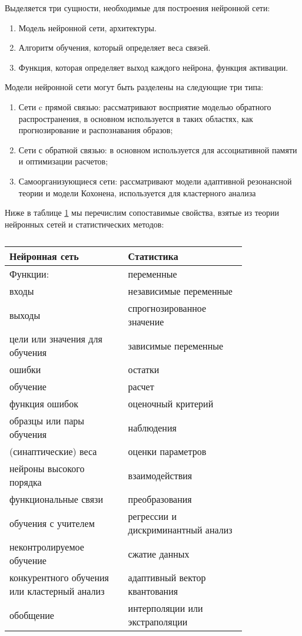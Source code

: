 Выделяется три сущности, необходимые для построения нейронной сети:
\begin{enumerate}
\item Модель нейронной сети, архитектуры.
\item Алгоритм обучения, который определяет веса связей.
\item Функция, которая определяет выход каждого нейрона, функция активации.
\end{enumerate}
Модели нейронной сети могут быть разделены
на следующие три типа:
\begin{enumerate}
	\item Сети c прямой связью: рассматривают восприятие
моделью обратного распространения, в основном используется в таких областях, как прогнозирование
и распознавания образов;
	\item Сети с обратной связью: в основном используется для
ассоциативной памяти и оптимизации расчетов;
	\item Самоорганизующиеся сети: рассматривают модели адаптивной
резонансной теории и модели Кохонена, используется для кластерного анализа
\end{enumerate}

Ниже в таблице \ref{table:neuro_stat_compare} мы перечислим сопоставимые свойства, взятые из теории 
нейронных сетей и статистических методов:

\begin{table}[!h]
\caption{}
\label{table:neuro_stat_compare}
\begin{center}
\begin{tabular}{|p{0.4\linewidth}|p{0.4\linewidth}|}
\hline \textbf{Нейронная сеть} & \textbf{Статистика} \\
\hline Функции: & переменные \\
\hline входы & независимые переменные \\
\hline выходы & спрогнозированное значение \\
\hline цели или значения для обучения & зависимые переменные \\
\hline ошибки & остатки \\
\hline обучение & расчет \\
\hline функция ошибок & оценочный критерий \\
\hline образцы или пары обучения & наблюдения \\
\hline (синаптические) веса & оценки параметров \\
\hline нейроны высокого порядка & взаимодействия \\
\hline функциональные связи & преобразования \\
\hline обучения с учителем & регрессии и дискриминантный анализ \\
\hline неконтролируемое обучение & сжатие данных \\
\hline конкурентного обучения или кластерный анализ & адаптивный вектор квантования \\
\hline обобщение & интерполяции или экстраполяции \\
\hline
\end{tabular}
\end{center}
\end{table}

